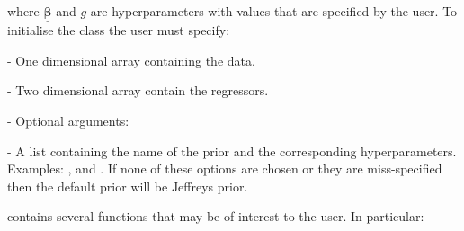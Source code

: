 \documentclass[article]{jss}
\begin{document}
where $\bm{\underline{\beta}}$ and $g$ are hyperparameters with values
that are specified by the user. To initialise the class
 the user must specify:
\begin{description}
\item {} - One dimensional  array containing the
  data.
\item {} - Two dimensional  array contain the
  regressors.
\item {} - Optional arguments:

  \begin{description}
  \item {} - A list containing the name of the prior and the
    corresponding hyperparameters. Examples: ,
     and . If none of these options are chosen or they are
    miss-specified then the default prior will be Jeffreys prior.
  \end{description}
\end{description}
 contains several functions that may be of
interest to the user. In particular:
\end{document}
